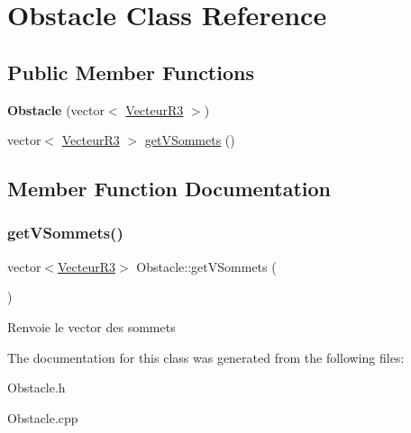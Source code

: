 \hypertarget{class_obstacle}{}\section{Obstacle Class Reference}
\label{class_obstacle}
\subsection*{Public Member Functions}
\begin{DoxyCompactItemize}
\item 
\mbox{\label{class_obstacle_a281adad6b96b85f062430f8de1b6a7c7}} 
{\bfseries Obstacle} (vector$<$ \mbox{\hyperlink{class_vecteur_r3}{Vecteur\+R3}} $>$)
\item 
vector$<$ \mbox{\hyperlink{class_vecteur_r3}{Vecteur\+R3}} $>$ \mbox{\hyperlink{class_obstacle_a5ee6ea25ceed6a640fce0c1bbb2d1ec0}{get\+V\+Sommets}} ()
\end{DoxyCompactItemize}


\subsection{Member Function Documentation}
\mbox{\label{class_obstacle_a5ee6ea25ceed6a640fce0c1bbb2d1ec0}} 
\subsubsection{\texorpdfstring{get\+V\+Sommets()}{getVSommets()}}
{\footnotesize\ttfamily vector$<$\mbox{\hyperlink{class_vecteur_r3}{Vecteur\+R3}}$>$ Obstacle\+::get\+V\+Sommets (\begin{DoxyParamCaption}{ }\end{DoxyParamCaption})}

Renvoie le vector des sommets 

The documentation for this class was generated from the following files\+:\begin{DoxyCompactItemize}
\item 
Obstacle.\+h\item 
Obstacle.\+cpp\end{DoxyCompactItemize}
